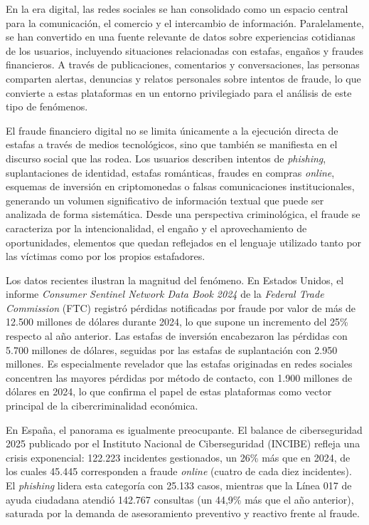 En la era digital, las redes sociales se han consolidado como un espacio central para la comunicación, el comercio y el intercambio de información. Paralelamente, se han convertido en una fuente relevante de datos sobre experiencias cotidianas de los usuarios, incluyendo situaciones relacionadas con estafas, engaños y fraudes financieros. A través de publicaciones, comentarios y conversaciones, las personas comparten alertas, denuncias y relatos personales sobre intentos de fraude, lo que convierte a estas plataformas en un entorno privilegiado para el análisis de este tipo de fenómenos.

El fraude financiero digital no se limita únicamente a la ejecución directa de estafas a través de medios tecnológicos, sino que también se manifiesta en el discurso social que las rodea. Los usuarios describen intentos de \textit{phishing}, suplantaciones de identidad, estafas románticas, fraudes en compras \textit{online}, esquemas de inversión en criptomonedas o falsas comunicaciones institucionales, generando un volumen significativo de información textual que puede ser analizada de forma sistemática. Desde una perspectiva criminológica, el fraude se caracteriza por la intencionalidad, el engaño y el aprovechamiento de oportunidades, elementos que quedan reflejados en el lenguaje utilizado tanto por las víctimas como por los propios estafadores.

Los datos recientes ilustran la magnitud del fenómeno. En Estados Unidos, el informe \textit{Consumer Sentinel Network Data Book 2024} de la \textit{Federal Trade Commission} (FTC) registró pérdidas notificadas por fraude por valor de más de 12.500 millones de dólares durante 2024, lo que supone un incremento del 25\% respecto al año anterior. Las estafas de inversión encabezaron las pérdidas con 5.700 millones de dólares, seguidas por las estafas de suplantación con 2.950 millones. Es especialmente revelador que las estafas originadas en redes sociales concentren las mayores pérdidas por método de contacto, con 1.900 millones de dólares en 2024, lo que confirma el papel de estas plataformas como vector principal de la cibercriminalidad económica.

En España, el panorama es igualmente preocupante. El balance de ciberseguridad 2025 publicado por el Instituto Nacional de Ciberseguridad (INCIBE) refleja una crisis exponencial: 122.223 incidentes gestionados, un 26\% más que en 2024, de los cuales 45.445 corresponden a fraude \textit{online} (cuatro de cada diez incidentes). El \textit{phishing} lidera esta categoría con 25.133 casos, mientras que la Línea 017 de ayuda ciudadana atendió 142.767 consultas (un 44,9\% más que el año anterior), saturada por la demanda de asesoramiento preventivo y reactivo frente al fraude.

